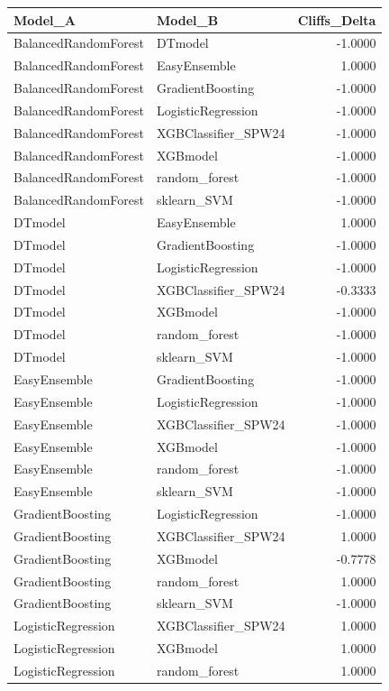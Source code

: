 \begin{table}[t]
\centering
\begin{tabular}{llr}
\toprule
Model_A & Model_B & Cliffs_Delta \\
\midrule
BalancedRandomForest & DTmodel & -1.0000 \\
BalancedRandomForest & EasyEnsemble & 1.0000 \\
BalancedRandomForest & GradientBoosting & -1.0000 \\
BalancedRandomForest & LogisticRegression & -1.0000 \\
BalancedRandomForest & XGBClassifier_SPW24 & -1.0000 \\
BalancedRandomForest & XGBmodel & -1.0000 \\
BalancedRandomForest & random_forest & -1.0000 \\
BalancedRandomForest & sklearn_SVM & -1.0000 \\
DTmodel & EasyEnsemble & 1.0000 \\
DTmodel & GradientBoosting & -1.0000 \\
DTmodel & LogisticRegression & -1.0000 \\
DTmodel & XGBClassifier_SPW24 & -0.3333 \\
DTmodel & XGBmodel & -1.0000 \\
DTmodel & random_forest & -1.0000 \\
DTmodel & sklearn_SVM & -1.0000 \\
EasyEnsemble & GradientBoosting & -1.0000 \\
EasyEnsemble & LogisticRegression & -1.0000 \\
EasyEnsemble & XGBClassifier_SPW24 & -1.0000 \\
EasyEnsemble & XGBmodel & -1.0000 \\
EasyEnsemble & random_forest & -1.0000 \\
EasyEnsemble & sklearn_SVM & -1.0000 \\
GradientBoosting & LogisticRegression & -1.0000 \\
GradientBoosting & XGBClassifier_SPW24 & 1.0000 \\
GradientBoosting & XGBmodel & -0.7778 \\
GradientBoosting & random_forest & 1.0000 \\
GradientBoosting & sklearn_SVM & -1.0000 \\
LogisticRegression & XGBClassifier_SPW24 & 1.0000 \\
LogisticRegression & XGBmodel & 1.0000 \\
LogisticRegression & random_forest & 1.0000 \\

\end{tabular}
\end{table}
